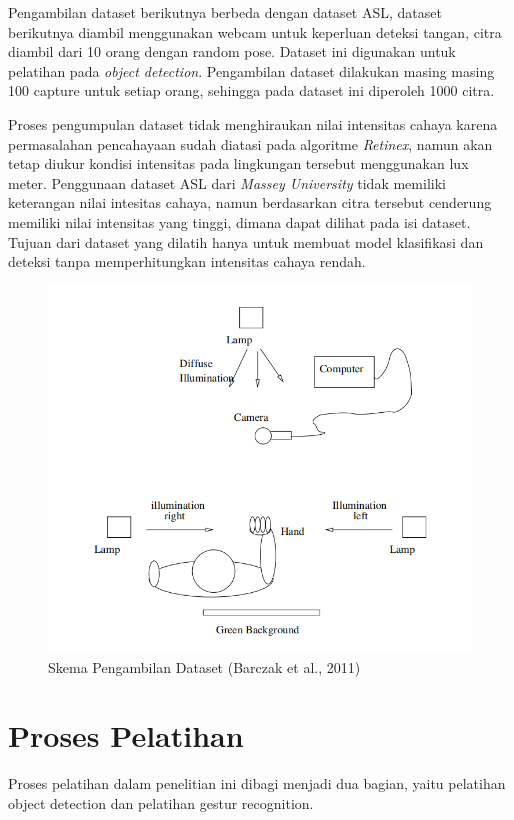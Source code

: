 Pengambilan dataset berikutnya berbeda dengan dataset ASL, dataset berikutnya diambil menggunakan webcam untuk keperluan deteksi tangan, citra diambil dari 10 orang dengan random pose. Dataset ini digunakan untuk pelatihan pada \emph{object detection}. 
Pengambilan dataset dilakukan masing masing 100 capture untuk setiap orang, sehingga pada dataset ini diperoleh 1000 citra. 

Proses pengumpulan dataset tidak menghiraukan nilai intensitas cahaya karena permasalahan pencahayaan sudah diatasi pada algoritme \emph{Retinex}, namun akan tetap diukur kondisi intensitas pada lingkungan tersebut menggunakan lux meter. Penggunaan dataset ASL dari \emph{Massey University} tidak memiliki keterangan nilai intesitas cahaya, namun berdasarkan citra tersebut cenderung memiliki nilai intensitas yang tinggi, dimana dapat dilihat pada isi dataset. Tujuan dari dataset yang dilatih hanya untuk membuat model klasifikasi dan deteksi tanpa memperhitungkan intensitas cahaya rendah.
\begin{figure}[H]
	\centering
	\includegraphics[width=0.8\linewidth]{setup}
	\caption{Skema Pengambilan Dataset (Barczak et al., 2011)}
	\label{fig:setup}
\end{figure}
\section{Proses Pelatihan}
Proses pelatihan dalam penelitian ini dibagi menjadi dua bagian, yaitu pelatihan object detection dan pelatihan gestur recognition.
